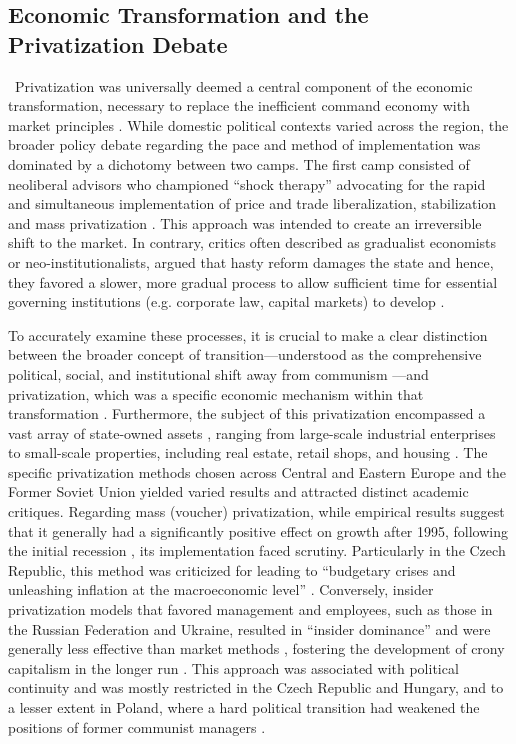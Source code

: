 \documentclass[12pt]{article}
\begin{document}
\subsection{Economic Transformation and the Privatization Debate}\
Privatization was universally deemed a central component of the economic transformation, necessary to replace the inefficient command economy with market principles \citep{Estrin1994, Berg1992}. 
While domestic political contexts varied across the region, the broader policy debate regarding the pace and method of implementation was dominated by a dichotomy between two camps. The first camp 
consisted of neoliberal advisors who championed ``shock therapy'' advocating for the rapid and simultaneous implementation of price and trade liberalization, stabilization and mass privatization 
\citep{Hamm2012}. This approach was intended to create an irreversible shift to the market. In contrary, critics often described as gradualist economists or neo-institutionalists, argued that hasty 
reform damages the state and hence, they favored a slower, more gradual process to allow sufficient time for essential governing institutions (e.g. corporate law, capital markets) to develop \citep{Rohac2016, Stuckler2009}.

To accurately examine these processes, it is crucial to make a clear distinction between the broader concept of transition—understood as the comprehensive political, social, and institutional shift away 
from communism \citep{A_Ramet2010}—and privatization, which was a specific economic mechanism within that transformation \citep{Estrin1994, Berg1992}. Furthermore, the subject of this privatization encompassed 
a vast array of state-owned assets \citep{A_Ramet2010}, ranging from large-scale industrial enterprises to small-scale properties, including real estate, retail shops, and housing \citep{EBRD1994, EBRD1999}.
The specific privatization methods chosen across Central and Eastern Europe and the Former Soviet Union yielded varied results and attracted distinct academic critiques. Regarding mass (voucher) 
privatization, while empirical results suggest that it generally had a significantly positive effect on growth after 1995, following the initial recession \citep{Estrin2004}, its implementation 
faced scrutiny. Particularly in the Czech Republic, this method was criticized for leading to ``budgetary crises and unleashing inflation at the macroeconomic level'' \citep{Marcincin1997}. Conversely, 
insider privatization models that favored management and employees, such as those in the Russian Federation and Ukraine, resulted in ``insider dominance'' and were generally less effective
than market methods \citep{Estrin2004, Djankov2002}, fostering the development of crony capitalism in the longer run \citep{Hoff2004, Stiglitz1999}. This approach was associated with political continuity and 
was mostly restricted in the Czech Republic and Hungary, and to a lesser extent in Poland, where a hard political transition had weakened the positions of former communist managers \citep{Soos1997}.
\end{document}
